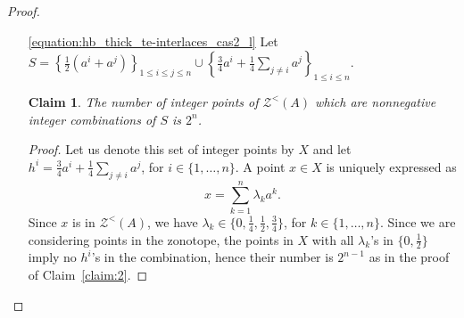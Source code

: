 \documentclass[11pt,a4paper]{amsart}
\renewcommand*{\leq}{\leqslant}
\theoremstyle{plain}
\newtheorem{claimnumb}{Claim}[theorem]{\itshape}{\rmfamily}
\theoremstyle{definition}
\newcommand{\cal}[1]{\mathcal{#1}}
\renewcommand{\cal}[1]{\mathcal{#1}}
\begin{document}
\begin{proof}
\begin{itemize}
\begin{proof}
	We need to compute the number of points of $X$ having coefficients also in $\{\frac{1}{4},\frac{3}{4}\}$.
	Since the $a^k$'s are $\pm1$, such points are expressed as $h+\tilde{x}$, where $\tilde{x}=\sum_{k=1}^n \mu_k a^k$ is a point in $X$ with all $\mu_k$'s in $\{0,\frac{1}{2}\}$, an even number of them being positive.
	We find all such $\tilde{x}$ by setting an even number of $\mu_k$'s to $\frac{1}{2}$ and the other ones to~$0$.
	
	Thus, such points $x$ are obtained by setting an even number of $\lambda_k$'s to $\frac{3}{4}$ and the others to $\frac14$, and, by Lemma~\ref{lemma:odd_and_even_sum}, their number is
	$$\sum_{i\text{ even}} \binom{n}{i}= 2^{n-1}.$$
	Finally, we have $|X| = 2^{n-1} + 2^{n-1} = 2^n$.	
	\end{proof}
\item[\ref{equation:hb_thick_te-interlaces_cas2_l}]
Let $S=\left\{\frac{1}{2} (a^i + a^j)\right\}_{1\leq i\leq j\leq n}\cup\left\{\frac{3}{4}a^i+\frac{1}{4}\sum_{j\neq i} a^j\right\}_{1\leq i\leq n}$.
\begin{claimnumb}\label{claim:5}
	The number of integer points of $\cal Z^<(A)$ which are nonnegative integer combinations of $S$ is $ 2^n$.
\end{claimnumb}
\begin{proof}
	Let us denote this set of integer points by $X$ and let $h^i=\frac{3}{4}a^i+\frac{1}{4}\sum_{j\neq i} a^j$, for $i\in\{1,\ldots,n\}$. A point $x\in X$ is uniquely expressed as
	$$x = \sum_{k=1}^n \lambda_k a^k.$$
	Since $x$ is in $\cal Z^<(A)$, we have $\lambda_k\in\{0,\frac{1}{4},\frac{1}{2},\frac{3}{4}\}$, for $k\in\{1,\ldots,n\}$.
	Since we are considering points in the zonotope, the points in $X$ with all $\lambda_k$'s in $\{0,\frac{1}{2}\}$ imply no $h^i$'s in the combination, hence their number is $2^{n-1}$ as in the proof of Claim~\ref{claim:2}.
	

\end{proof}
\end{itemize}
\end{proof}
\end{document}
